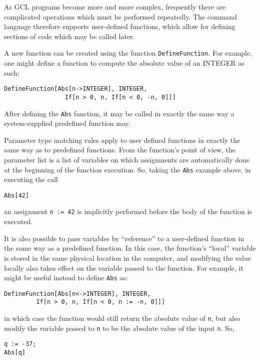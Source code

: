 As GCL programs become more and more complex, frequently there are complicated
operations which must be performed repeatedly.  The command language therefore
supports user-defined functions, which allow for defining sections of code
which may be called later.

A new function can be created using the function
\verb+DefineFunction+.  For example, one might define a function to compute
the absolute value of an INTEGER as such:

\begin{verbatim}
DefineFunction[Abs[n->INTEGER], INTEGER,
                 If[n > 0, n, If[n < 0, -n, 0]]]
\end{verbatim}

\noindent After defining the \verb+Abs+ function, it may be called in exactly
the same way a system-supplied predefined function may.

Parameter type matching rules apply to user defined functions in exactly the
same way as to predefined functions.  From the function's point of view,
the parameter list is a list of variables on which assignments are
automatically done at the beginning of the function execution.  So, taking
the \verb+Abs+ example above, in executing the call

\begin{verbatim}
Abs[42]
\end{verbatim}

\noindent an assignment \verb+n := 42+ is implicitly performed before the
body of the function is executed.

It is also possible to pass variables by ``reference'' to a user-defined
function in the same way as a predefined function.  In this case, the
function's ``local'' variable is stored in the same physical location in the
computer, and modifying the value locally also takes effect on the variable
passed to the function.  For example, it might
be useful instead to define \verb+Abs+ as:

\begin{verbatim}
DefineFunction[Abs[n<->INTEGER], INTEGER,
		 If[n > 0, n, If[n < 0, n := -n, 0]]]
\end{verbatim}

\noindent in which case the function would still return the absolute value
of \verb+n+, but also modify the variable passed to \verb+n+ to be the
absolute value of the input \verb+n+.  So,

\begin{verbatim}
q := -37;
Abs[q]
\end{verbatim}


